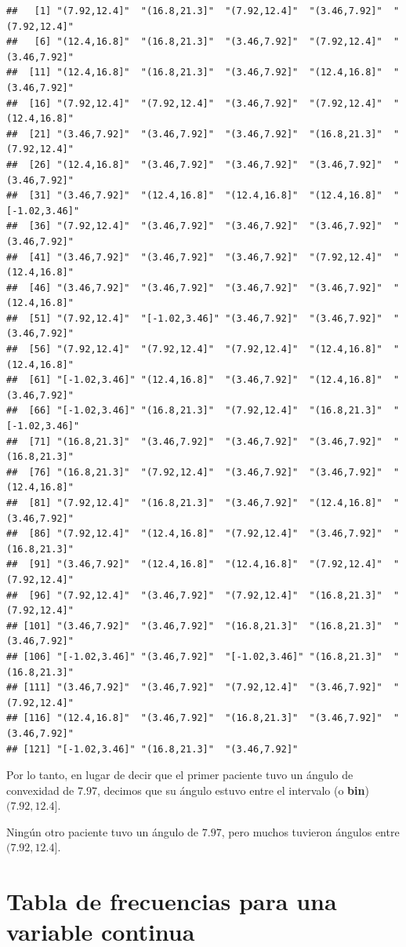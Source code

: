 \documentclass[
]{book}
\begin{document}
\begin{verbatim}
##   [1] "(7.92,12.4]"  "(16.8,21.3]"  "(7.92,12.4]"  "(3.46,7.92]"  "(7.92,12.4]" 
##   [6] "(12.4,16.8]"  "(16.8,21.3]"  "(3.46,7.92]"  "(7.92,12.4]"  "(3.46,7.92]" 
##  [11] "(12.4,16.8]"  "(16.8,21.3]"  "(3.46,7.92]"  "(12.4,16.8]"  "(3.46,7.92]" 
##  [16] "(7.92,12.4]"  "(7.92,12.4]"  "(3.46,7.92]"  "(7.92,12.4]"  "(12.4,16.8]" 
##  [21] "(3.46,7.92]"  "(3.46,7.92]"  "(3.46,7.92]"  "(16.8,21.3]"  "(7.92,12.4]" 
##  [26] "(12.4,16.8]"  "(3.46,7.92]"  "(3.46,7.92]"  "(3.46,7.92]"  "(3.46,7.92]" 
##  [31] "(3.46,7.92]"  "(12.4,16.8]"  "(12.4,16.8]"  "(12.4,16.8]"  "[-1.02,3.46]"
##  [36] "(7.92,12.4]"  "(3.46,7.92]"  "(3.46,7.92]"  "(3.46,7.92]"  "(3.46,7.92]" 
##  [41] "(3.46,7.92]"  "(3.46,7.92]"  "(3.46,7.92]"  "(7.92,12.4]"  "(12.4,16.8]" 
##  [46] "(3.46,7.92]"  "(3.46,7.92]"  "(3.46,7.92]"  "(3.46,7.92]"  "(12.4,16.8]" 
##  [51] "(7.92,12.4]"  "[-1.02,3.46]" "(3.46,7.92]"  "(3.46,7.92]"  "(3.46,7.92]" 
##  [56] "(7.92,12.4]"  "(7.92,12.4]"  "(7.92,12.4]"  "(12.4,16.8]"  "(12.4,16.8]" 
##  [61] "[-1.02,3.46]" "(12.4,16.8]"  "(3.46,7.92]"  "(12.4,16.8]"  "(3.46,7.92]" 
##  [66] "[-1.02,3.46]" "(16.8,21.3]"  "(7.92,12.4]"  "(16.8,21.3]"  "[-1.02,3.46]"
##  [71] "(16.8,21.3]"  "(3.46,7.92]"  "(3.46,7.92]"  "(3.46,7.92]"  "(16.8,21.3]" 
##  [76] "(16.8,21.3]"  "(7.92,12.4]"  "(3.46,7.92]"  "(3.46,7.92]"  "(12.4,16.8]" 
##  [81] "(7.92,12.4]"  "(16.8,21.3]"  "(3.46,7.92]"  "(12.4,16.8]"  "(3.46,7.92]" 
##  [86] "(7.92,12.4]"  "(12.4,16.8]"  "(7.92,12.4]"  "(3.46,7.92]"  "(16.8,21.3]" 
##  [91] "(3.46,7.92]"  "(12.4,16.8]"  "(12.4,16.8]"  "(7.92,12.4]"  "(7.92,12.4]" 
##  [96] "(7.92,12.4]"  "(3.46,7.92]"  "(7.92,12.4]"  "(16.8,21.3]"  "(7.92,12.4]" 
## [101] "(3.46,7.92]"  "(3.46,7.92]"  "(16.8,21.3]"  "(16.8,21.3]"  "(3.46,7.92]" 
## [106] "[-1.02,3.46]" "(3.46,7.92]"  "[-1.02,3.46]" "(16.8,21.3]"  "(16.8,21.3]" 
## [111] "(3.46,7.92]"  "(3.46,7.92]"  "(7.92,12.4]"  "(3.46,7.92]"  "(7.92,12.4]" 
## [116] "(12.4,16.8]"  "(3.46,7.92]"  "(16.8,21.3]"  "(3.46,7.92]"  "(3.46,7.92]" 
## [121] "[-1.02,3.46]" "(16.8,21.3]"  "(3.46,7.92]"
\end{verbatim}

Por lo tanto, en lugar de decir que el primer paciente tuvo un ángulo de convexidad de \(7.97\), decimos que su ángulo estuvo entre el intervalo (o \textbf{bin}) \((7.92,12.4]\).

Ningún otro paciente tuvo un ángulo de \(7.97\), pero muchos tuvieron ángulos entre \((7.92,12.4]\).

\hypertarget{tabla-de-frecuencias-para-una-variable-continua}{%
\section{Tabla de frecuencias para una variable continua}\label{tabla-de-frecuencias-para-una-variable-continua}}
\end{document}
